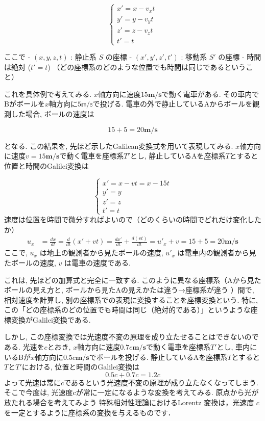 \documentclass{ltjsarticle}
\begin{document}
\[
\begin{cases}
x' = x - v_x t \\

y' = y - v_y t \\
z' = z - v_z t \\
t' = t
\end{cases}
\]

ここで
- \((x, y, z, t)\) : 静止系 \(S\) の座標  
- \((x', y', z', t')\) : 移動系 \(S'\) の座標  
- 時間は絶対 (\(t' = t\))  （どの座標系のどのような位置でも時間は同じであるということ）

これを具体例で考えてみる. 
$x$軸方向に速度$15\mathbf{m/s}$で動く電車がある. 
その車内でBがボールを$x$軸方向に$5\mathbb{m/s}$で投げる. 
電車の外で静止しているAからボールを観測した場合, ボールの速度は

\[
15 + 5 = 20\mathbf{m/s}
\]

となる. 
この結果を, 先ほど示したGalilean変換式を用いて表現してみる. 
$x$軸方向に速度$v = 15\mathbf{m/s}$で動く電車を座標系$T'$とし, 静止しているAを座標系$T$とすると位置と時間のGalilei変換は

\[
\begin{cases}
x' = x - vt = x - 15 t \\
y' = y \\
z' = z \\
t' = t
\end{cases}
\]
速度は位置を時間で微分すればよいので（どのくらいの時間でどれだけ変化したか）
\[
\begin{aligned}
u_x &= \frac{dx}{dt} = \frac{d}{dt}(x' + v t) = \frac{dx'}{dt} + \frac{d(vt)}{dt} = u'_x + v = 15 + 5 = 20\mathbf{m/s}
\end{aligned}
\]
ここで, $u_x$ は地上の観測者から見たボールの速度, $u'_x$ は電車内の観測者から見たボールの速度, $v$ は電車の速度である. 

これは, 先ほどの加算式と完全に一致する. 
このように異なる座標系（Aから見たボールの見え方と, ボールから見たAの見えかたは違う→座標系が違う ）間で, 
相対速度を計算し, 別の座標系での表現に変換することを座標変換という. 
特に, この「どの座標系のどの位置でも時間は同じ（絶対的である）」というような座標変換がGalilei変換である. 

しかし, この座標変換では光速度不変の原理を成り立たせることはできないのである. 光速を$c$とおき, 
$x$軸方向に速度$0.7c\mathbf{m/s}$で動く電車を座標系$T'$とし, 車内にいるBが$x$軸方向に$0.5c\mathbf{m/s}$でボールを投げる. 
静止しているAを座標系$T$とすると$T$と$T'$における, 位置と時間のGalilei変換は
\[
0.5c + 0.7c = 1.2c
\]
よって光速は常に$c$であるという光速度不変の原理が成り立たなくなってしまう. 
そこで今度は, 光速度cが常に一定になるような変換を考えてみる. 
原点から光が放たれる場合を考えてみよう
特殊相対性理論におけるLorentz 変換は，光速度 $c$ を一定とするように座標系の変換を与えるものです．
\end{document}
